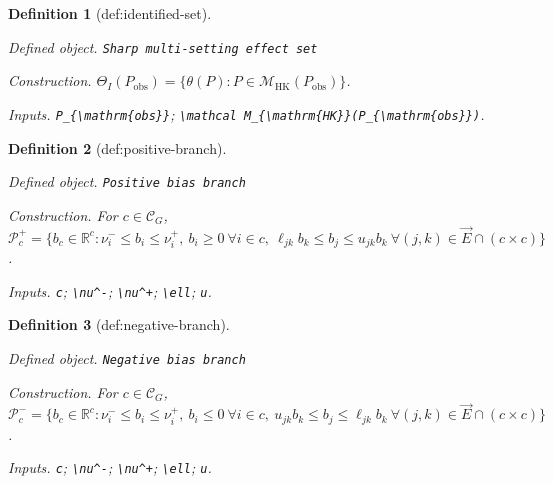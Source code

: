 \documentclass{article}
\newtheorem{definition}{Definition}
\begin{document}
\begin{definition}[def:identified-set]\label{def:identified-set}
\par\smallskip\noindent\emph{Defined object.} \texttt{Sharp multi-\allowbreak{}setting effect set}
\par\smallskip\noindent\emph{Construction.} \(\Theta_I(P_{\mathrm{obs}})=\{\theta(P):P\in\mathcal M_{\mathrm{HK}}(P_{\mathrm{obs}})\}\).
\par\smallskip\noindent\emph{Inputs.} \texttt{P\_\allowbreak{}\{\textbackslash{}\allowbreak{}mathrm\{obs\}\allowbreak{}\}\allowbreak{}}; \texttt{\textbackslash{}\allowbreak{}mathcal M\_\allowbreak{}\{\textbackslash{}\allowbreak{}mathrm\{HK\}\allowbreak{}\}\allowbreak{}(P\_\allowbreak{}\{\textbackslash{}\allowbreak{}mathrm\{obs\}\allowbreak{}\}\allowbreak{})}.
\end{definition}

\begin{definition}[def:positive-branch]\label{def:positive-branch}
\par\smallskip\noindent\emph{Defined object.} \texttt{Positive bias branch}
\par\smallskip\noindent\emph{Construction.} For \(c\in\mathcal C_G\), \(\mathcal P_c^+=\{b_c\in\mathbb R^c:\nu^-_i\le b_i\le\nu^+_i,\ b_i\ge0\ \forall i\in c,\ \ell_{jk}b_k\le b_j\le u_{jk}b_k\ \forall(j,k)\in\vec E\cap(c\times c)\}\).
\par\smallskip\noindent\emph{Inputs.} \texttt{c}; \texttt{\textbackslash{}\allowbreak{}nu\textasciicircum{}-\allowbreak{}}; \texttt{\textbackslash{}\allowbreak{}nu\textasciicircum{}+\allowbreak{}}; \texttt{\textbackslash{}\allowbreak{}ell}; \texttt{u}.
\end{definition}

\begin{definition}[def:negative-branch]\label{def:negative-branch}
\par\smallskip\noindent\emph{Defined object.} \texttt{Negative bias branch}
\par\smallskip\noindent\emph{Construction.} For \(c\in\mathcal C_G\), \(\mathcal P_c^-=\{b_c\in\mathbb R^c:\nu^-_i\le b_i\le\nu^+_i,\ b_i\le0\ \forall i\in c,\ u_{jk}b_k\le b_j\le\ell_{jk}b_k\ \forall(j,k)\in\vec E\cap(c\times c)\}\).
\par\smallskip\noindent\emph{Inputs.} \texttt{c}; \texttt{\textbackslash{}\allowbreak{}nu\textasciicircum{}-\allowbreak{}}; \texttt{\textbackslash{}\allowbreak{}nu\textasciicircum{}+\allowbreak{}}; \texttt{\textbackslash{}\allowbreak{}ell}; \texttt{u}.
\end{definition}
\end{document}
